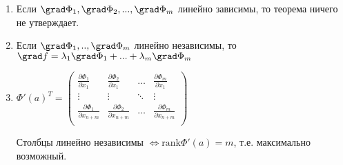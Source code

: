 \begin{remark}\thmslashn
	
	\begin{enumerate}
		
		\item Если $\grad \Phi_1, \grad \Phi_2, ..., \grad \Phi_m$ линейно зависимы, то теорема ничего не утверждает.
		
		\item Если $\grad \Phi_1, .., \grad \Phi_m$ линейно независимы, то $\grad f = \lambda_1 \grad \Phi_1 + ...+\lambda_m \grad \Phi_m$
		
		\item $\Phi'(a)^T = \begin{pmatrix}
		\frac{\partial \Phi_1}{\partial x_1} & \frac{\partial \Phi_2}{\partial x_1} & \dots & \frac{\partial \Phi_m}{\partial x_1}\\
		\vdots & \vdots & \ddots & \vdots\\
		\frac{\partial \Phi_1}{\partial x_{n+m}} & \frac{\partial \Phi_2}{\partial x_{n+m}} & \dots & \frac{\partial \Phi_m}{\partial x_{n+m}}\\
		\end{pmatrix}$
		
		Столбцы линейно независимы $\iff \text{rank}  \Phi'(a) = m$, т.е. максимально возможный.
	\end{enumerate}
\end{remark}

